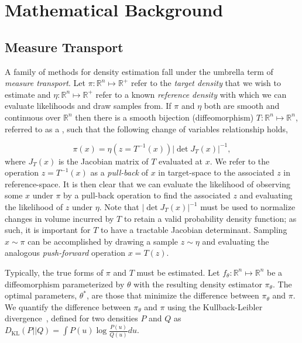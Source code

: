 \chapter{Mathematical Background}\label{ch:background}

\section{Measure Transport}\label{sec:measure-transport}

A family of methods for density estimation fall under the umbrella term of \textit{measure transport}.
Let $\pi: \mathbb{R}^n \mapsto \mathbb{R}^+$ refer to the \textit{target density} that we wish to estimate
and $\eta: \mathbb{R}^n \mapsto \mathbb{R}^+$ refer to a known \textit{reference density} with which we can evaluate
likelihoods and draw samples from.
If $\pi$ and $\eta$ both are smooth and continuous over $\mathbb{R}^n$ then there is a smooth bijection (diffeomorphism)
$T: \mathbb{R}^n \mapsto \mathbb{R}^n$, referred to as a , such that the following change of variables
relationship holds,

\begin{equation*}
    \pi(x) = \eta\left( z=T^{-1}(x) \right) \left| \det J_T(x) \right|^{-1},
    \label{eq:change-of-vars}
\end{equation*}
where $J_T(x)$ is the Jacobian matrix of $T$ evaluated at $x$.
We refer to the operation $z = T^{-1}(x)$ as a \textit{pull-back} of $x$ in target-space to the associated $z$ in
reference-space.
It is then clear that we can evaluate the likelihood of observing some $x$ under $\pi$ by a
pull-back operation to find the associated $z$ and evaluating the likelihood of $z$ under $\eta$.
Note that $\left| \det J_T(x) \right|^{-1}$ must be used to normalize changes in volume incurred by $T$ to retain a
valid probability density function; as such, it is important for $T$ to have a tractable Jacobian determinant.
Sampling $x \sim \pi$ can be accomplished by drawing a sample $z \sim \eta$ and evaluating the analogous
\textit{push-forward} operation $x = T(z)$.

Typically, the true forms of $\pi$ and $T$ must be estimated.
Let $f_\theta : \mathbb{R}^n \mapsto \mathbb{R}^n$ be a diffeomorphism parameterized by $\theta$ with the resulting
density estimator $\pi_\theta$.
The optimal parameters, $\theta^*$, are those that minimize the difference between $\pi_\theta$ and $\pi$.
We quantify the difference between $\pi_\theta$ and $\pi$ using the Kullback-Leibler divergence~\cite{kl_div},
defined for two densities $P$ and $Q$ as $D_{\text{KL}}(P || Q) = \int P(u) \log \frac{P(u)}{Q(u)} du$.

